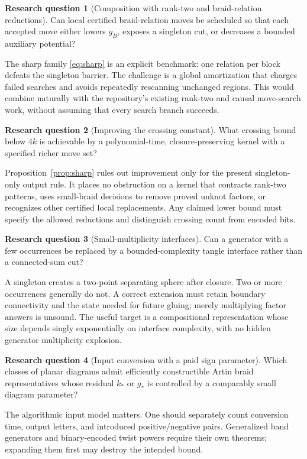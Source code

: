 \documentclass[11pt,letterpaper]{article}
\theoremstyle{definition}
\newtheorem{question}{Research question}[section]
\begin{document}
\begin{question}[Composition with rank-two and braid-relation reductions]
Can local certified braid-relation moves be scheduled so that each accepted move either lowers $g_B$, exposes a singleton cut, or decreases a bounded auxiliary potential?
\end{question}
The sharp family \eqref{eq:sharp} is an explicit benchmark: one relation per block defeats the singleton barrier. The challenge is a global amortization that charges failed searches and avoids repeatedly rescanning unchanged regions. This would combine naturally with the repository's existing rank-two and causal move-search work, without assuming that every search branch succeeds.

\begin{question}[Improving the crossing constant]
What crossing bound below $4k$ is achievable by a polynomial-time, closure-preserving kernel with a specified richer move set?
\end{question}
Proposition~\ref{prop:sharp} rules out improvement only for the present singleton-only output rule. It places no obstruction on a kernel that contracts rank-two patterns, uses small-braid decisions to remove proved unknot factors, or recognizes other certified local replacements. Any claimed lower bound must specify the allowed reductions and distinguish crossing count from encoded bits.

\begin{question}[Small-multiplicity interfaces]
Can a generator with a few occurrences be replaced by a bounded-complexity tangle interface rather than a connected-sum cut?
\end{question}
A singleton creates a two-point separating sphere after closure. Two or more occurrences generally do not. A correct extension must retain boundary connectivity and the state needed for future gluing; merely multiplying factor answers is unsound. The useful target is a compositional representation whose size depends singly exponentially on interface complexity, with no hidden generator multiplicity explosion.

\begin{question}[Input conversion with a paid sign parameter]
Which classes of planar diagrams admit efficiently constructible Artin braid representatives whose residual $k_*$ or $g_*$ is controlled by a comparably small diagram parameter?
\end{question}
The algorithmic input model matters. One should separately count conversion time, output letters, and introduced positive/negative pairs. Generalized band generators and binary-encoded twist powers require their own theorems; expanding them first may destroy the intended bound.
\end{document}
